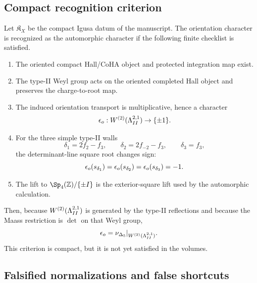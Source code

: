 \subsection{Compact recognition criterion}

Let \(\mathfrak K_X\) be the compact Igusa datum of the manuscript.
The orientation character is recognized as the automorphic character if
the following finite checklist is satisfied.

\begin{enumerate}
\item The oriented compact Hall/CoHA object and protected integration map
exist.
\item The type-II Weyl group acts on the oriented completed Hall object
and preserves the charge-to-root map.
\item The induced orientation transport is multiplicative, hence a
character
\[
\epsilon_o:W^{(2)}(\Lambda^{2,1}_{II})\to\{\pm1\}.
\]
\item For the three simple type-II walls
\[
\delta_1=2f_2-f_3,\qquad
\delta_2=2f_{-2}-f_3,\qquad
\delta_3=f_3,
\]
the determinant-line square root changes sign:
\[
\epsilon_o(s_{\delta_1})=\epsilon_o(s_{\delta_2})=\epsilon_o(s_{\delta_3})=-1.
\]
\item The lift to \(\Sp_4(\Z)/\{\pm I\}\) is the exterior-square lift
used by the automorphic calculation.
\end{enumerate}

Then, because \(W^{(2)}(\Lambda^{2,1}_{II})\) is generated by the type-II
reflections and because the Maass restriction is \(\det\) on that Weyl
group,
\[
\epsilon_o=\nu_{\Delta_5}|_{W^{(2)}(\Lambda^{2,1}_{II})}.
\]
This criterion is compact, but it is not yet satisfied in the volumes.

\subsection{Falsified normalizations and false shortcuts}

